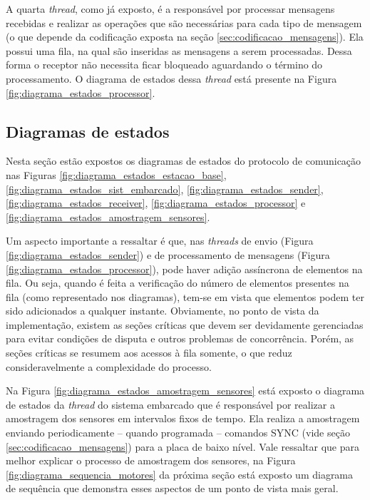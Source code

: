 A quarta \textit{thread}, como já exposto, é a responsável por processar mensagens recebidas e realizar as operações que são necessárias para cada tipo de mensagem (o que depende da codificação exposta na seção \ref{sec:codificacao_mensagens}). Ela possui uma fila, na qual são inseridas as mensagens a serem processadas. Dessa forma o receptor não necessita ficar bloqueado aguardando o término do processamento. O diagrama de estados dessa \textit{thread} está presente na Figura \ref{fig:diagrama_estados_processor}.

\subsection{Diagramas de estados}

Nesta seção estão expostos os diagramas de estados do protocolo de comunicação nas Figuras \ref{fig:diagrama_estados_estacao_base}, \ref{fig:diagrama_estados_sist_embarcado}, \ref{fig:diagrama_estados_sender}, \ref{fig:diagrama_estados_receiver}, \ref{fig:diagrama_estados_processor} e \ref{fig:diagrama_estados_amostragem_sensores}.

Um aspecto importante a ressaltar é que, nas \textit{threads} de envio (Figura \ref{fig:diagrama_estados_sender}) e de processamento de mensagens (Figura \ref{fig:diagrama_estados_processor}), pode haver adição assíncrona de elementos na fila. Ou seja, quando é feita a verificação do número de elementos presentes na fila (como representado nos diagramas), tem-se em vista que elementos podem ter sido adicionados a qualquer instante. Obviamente, no ponto de vista da implementação, existem as seções críticas que devem ser devidamente gerenciadas para evitar condições de disputa e outros problemas de concorrência. Porém, as seções críticas se resumem aos acessos à fila somente, o que reduz consideravelmente a complexidade do processo.

Na Figura \ref{fig:diagrama_estados_amostragem_sensores} está exposto o diagrama de estados da \textit{thread} do sistema embarcado que é responsável por realizar a amostragem dos sensores em intervalos fixos de tempo. Ela realiza a amostragem enviando periodicamente -- quando programada -- comandos SYNC (vide seção \ref{sec:codificacao_mensagens}) para a placa de baixo nível. Vale ressaltar que para melhor explicar o processo de amostragem dos sensores, na Figura \ref{fig:diagrama_sequencia_motores} da próxima seção está exposto um diagrama de sequência que demonstra esses aspectos de um ponto de vista mais geral.



